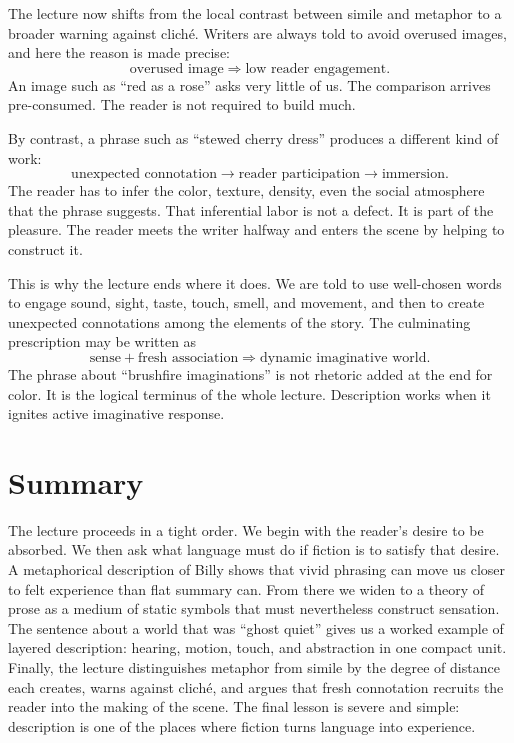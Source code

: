 The lecture now shifts from the local contrast between simile and metaphor to a broader warning against clich\'e. Writers are always told to avoid overused images, and here the reason is made precise:
\begin{equation}
\text{overused image} \Rightarrow \text{low reader engagement}.
\end{equation}
An image such as ``red as a rose'' asks very little of us. The comparison arrives pre-consumed. The reader is not required to build much.

By contrast, a phrase such as ``stewed cherry dress'' produces a different kind of work:
\begin{equation}
\text{unexpected connotation} \to \text{reader participation} \to \text{immersion}.
\end{equation}
The reader has to infer the color, texture, density, even the social atmosphere that the phrase suggests. That inferential labor is not a defect. It is part of the pleasure. The reader meets the writer halfway and enters the scene by helping to construct it.

This is why the lecture ends where it does. We are told to use well-chosen words to engage sound, sight, taste, touch, smell, and movement, and then to create unexpected connotations among the elements of the story. The culminating prescription may be written as
\begin{equation}
\text{sense} + \text{fresh association} \Rightarrow \text{dynamic imaginative world}.
\end{equation}
The phrase about ``brushfire imaginations'' is not rhetoric added at the end for color. It is the logical terminus of the whole lecture. Description works when it ignites active imaginative response.

\section{Summary}

The lecture proceeds in a tight order. We begin with the reader's desire to be absorbed. We then ask what language must do if fiction is to satisfy that desire. A metaphorical description of Billy shows that vivid phrasing can move us closer to felt experience than flat summary can. From there we widen to a theory of prose as a medium of static symbols that must nevertheless construct sensation. The sentence about a world that was ``ghost quiet'' gives us a worked example of layered description: hearing, motion, touch, and abstraction in one compact unit. Finally, the lecture distinguishes metaphor from simile by the degree of distance each creates, warns against clich\'e, and argues that fresh connotation recruits the reader into the making of the scene. The final lesson is severe and simple: description is one of the places where fiction turns language into experience.
